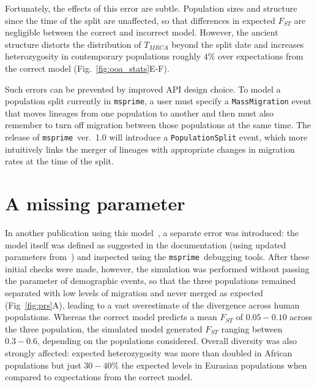 \documentclass{article}
\newcommand{\msprime}[0]{\texttt{msprime}}
\newcommand{\aprcomment}[1]{{\textcolor{blue}{APR: #1}}}
\begin{document}
Fortunately, the effects of this error are subtle. Population sizes and structure since the time of
the split are unaffected, so that differences in expected $F_{ST}$ are negligible between
the correct and incorrect model. However, the ancient structure distorts the distribution
of $T_{MRCA}$ beyond the split date and increases
heterozygosity in contemporary populations roughly $4\%$ over expectations
from the correct model (Fig.~\ref{fig:ooa_stats}E-F).


Such errors can be prevented by improved API design choice.
To model a population split currently in \msprime, a user must specify a
\texttt{MassMigration} event that moves lineages from one population to another
and then must also remember to turn off migration
between those populations at the same time.
The release of \msprime~ver.~1.0 will introduce a \texttt{PopulationSplit} event,
which more intuitively links the merger of lineages with appropriate changes in
migration rates at the time of the split.

\section{A missing parameter}

In another publication using this model~\citep{martin2017human},
a separate error was introduced: the model itself was defined as suggested
in the documentation (using updated parameters
from~\citet{gravel2011demographic}) and inspected
using the \msprime\ debugging tools.
After these initial checks were made, however, the simulation
was performed without passing the parameter of demographic events,
so that the three populations remained separated with low levels of migration and
never merged as expected (Fig~\ref{fig:prs}A),
leading to a vast overestimate of the divergence across human populations.
Whereas the correct model predicts a mean $F_{ST}$ of
$0.05 - 0.10$ across the three population, the simulated model generated $F_{ST}$
ranging between $0.3 - 0.6$, depending on the populations considered.
Overall diversity was also strongly affected: expected heterozygosity was more than
doubled in African populations but just $30-40\%$ the expected
levels in Eurasian populations when compared to expectations from the correct model.
\end{document}
